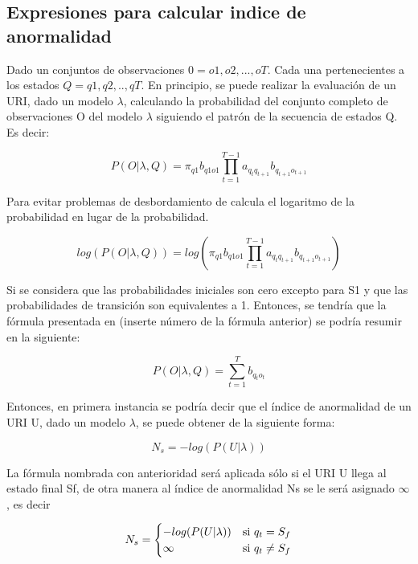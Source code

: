 \subsection{Expresiones para calcular indice de anormalidad}


Dado un conjuntos de observaciones $0 = o1,o2,...,oT$. Cada una pertenecientes a los estados $Q = q1,q2,..,qT$. En principio, se puede realizar la evaluación de un URI, dado un modelo $\lambda$,  calculando la probabilidad del conjunto completo de observaciones O del modelo $\lambda$ siguiendo el patrón de la secuencia de estados Q. Es decir:

\begin{equation}
P(O|\lambda,Q) = \pi_{q1}b_{q1o1}\prod_{t=1}^{T-1}a_{q_{t}q_{t+1}}b_{q_{t+1}o_{t+1}}
\end{equation}

Para evitar problemas de desbordamiento de calcula el logaritmo de la probabilidad en lugar de la probabilidad.

\begin{equation}
log(P(O|\lambda,Q)) = log(\pi_{q1}b_{q1o1}\prod_{t=1}^{T-1}a_{q_{t}q_{t+1}}b_{q_{t+1}o_{t+1}})
\end{equation}

Si se considera que las probabilidades iniciales son cero excepto para S1 y que las probabilidades de transición son equivalentes a 1. Entonces, se tendría que la fórmula presentada en (inserte número de la fórmula anterior)  se podría resumir en la siguiente:

\begin{equation}
P(O|\lambda,Q) = \sum_{t=1}^{T}b_{q_{t}o_{t}}
\end{equation}

Entonces, en primera instancia se podría decir que el índice de anormalidad de un URI U, dado un modelo $\lambda$, se puede obtener de la siguiente forma:

\begin{equation}
N_{s} = -log(P(U|\lambda))
\end{equation}

La fórmula nombrada con anterioridad será aplicada sólo si el URI U llega al estado final Sf, de otra manera al índice de anormalidad Ns se le será asignado $\infty$, es decir

\begin{equation}
N_{s} = 
	\begin{cases} 
      -log(P(U|\lambda)) & $si $  q_{t} = S_{f} \\
      \infty & $si $  q_{t} \neq S_{f} \\ 
   \end{cases}
\end{equation}


